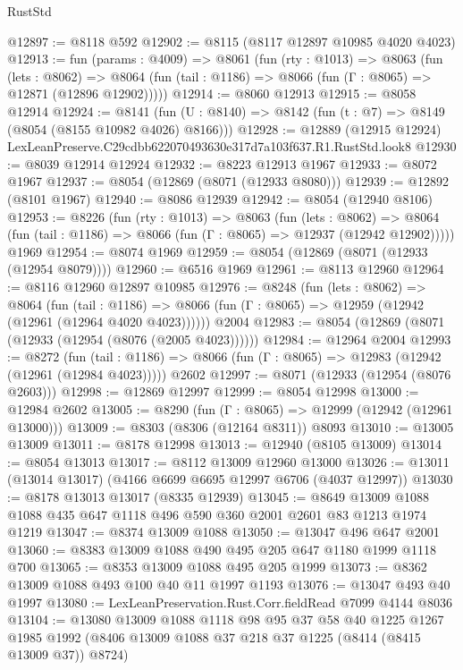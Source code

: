 \begin{lexlean}{RustStd}
\begin{coremodule}
@12897 := @8118 @592
@12902 := @8115 (@8117 @12897 @10985 @4020 @4023)
@12913 := fun (params : @4009) =>
  @8061
    (fun (rty : @1013) =>
    @8063
      (fun (lets : @8062) =>
      @8064 (fun (tail : @1186) => @8066 (fun (Γ : @8065) => @12871 (@12896 @12902)))))
@12914 := @8060 @12913
@12915 := @8058 @12914
@12924 := @8141
    (fun (U : @8140) => @8142 (fun (t : @7) => @8149 (@8054 (@8155 @10982 @4026) @8166)))
@12928 := @12889 (@12915 @12924) LexLeanPreserve.C29cdbb622070493630e317d7a103f637.R1.RustStd.look8
@12930 := @8039 @12914 @12924
@12932 := @8223 @12913 @1967
@12933 := @8072 @1967
@12937 := @8054 (@12869 (@8071 (@12933 @8080)))
@12939 := @12892 (@8101 @1967)
@12940 := @8086 @12939
@12942 := @8054 (@12940 @8106)
@12953 := @8226
    (fun (rty : @1013) =>
    @8063
      (fun (lets : @8062) =>
      @8064 (fun (tail : @1186) => @8066 (fun (Γ : @8065) => @12937 (@12942 @12902)))))
    @1969
@12954 := @8074 @1969
@12959 := @8054 (@12869 (@8071 (@12933 (@12954 @8079))))
@12960 := @6516 @1969
@12961 := @8113 @12960
@12964 := @8116 @12960 @12897 @10985
@12976 := @8248
    (fun (lets : @8062) =>
    @8064
      (fun (tail : @1186) =>
      @8066 (fun (Γ : @8065) => @12959 (@12942 (@12961 (@12964 @4020 @4023))))))
    @2004
@12983 := @8054 (@12869 (@8071 (@12933 (@12954 (@8076 (@2005 @4023))))))
@12984 := @12964 @2004
@12993 := @8272
    (fun (tail : @1186) => @8066 (fun (Γ : @8065) => @12983 (@12942 (@12961 (@12984 @4023)))))
    @2602
@12997 := @8071 (@12933 (@12954 (@8076 @2603)))
@12998 := @12869 @12997
@12999 := @8054 @12998
@13000 := @12984 @2602
@13005 := @8290 (fun (Γ : @8065) => @12999 (@12942 (@12961 @13000)))
@13009 := @8303 (@8306 (@12164 @8311)) @8093
@13010 := @13005 @13009
@13011 := @8178 @12998
@13013 := @12940 (@8105 @13009)
@13014 := @8054 @13013
@13017 := @8112 @13009 @12960 @13000
@13026 := @13011 (@13014 @13017) (@4166 @6699 @6695 @12997 @6706 (@4037 @12997))
@13030 := @8178 @13013 @13017 (@8335 @12939)
@13045 := @8649 @13009 @1088 @1088 @435 @647 @1118 @496 @590 @360 @2001 @2601 @83 @1213 @1974 @1219
@13047 := @8374 @13009 @1088
@13050 := @13047 @496 @647 @2001
@13060 := @8383 @13009 @1088 @490 @495 @205 @647 @1180 @1999 @1118 @700
@13065 := @8353 @13009 @1088 @495 @205 @1999
@13073 := @8362 @13009 @1088 @493 @100 @40 @11 @1997 @1193
@13076 := @13047 @493 @40 @1997
@13080 := LexLeanPreservation.Rust.Corr.fieldRead @7099 @4144 @8036
@13104 := @13080
    @13009
    @1088
    @1118
    @98
    @95
    @37
    @58
    @40
    @1225
    @1267
    @1985
    @1992
    (@8406 @13009 @1088 @37 @218 @37 @1225 (@8414 (@8415 @13009 @37)) @8724)

\end{coremodule}
\end{lexlean}
